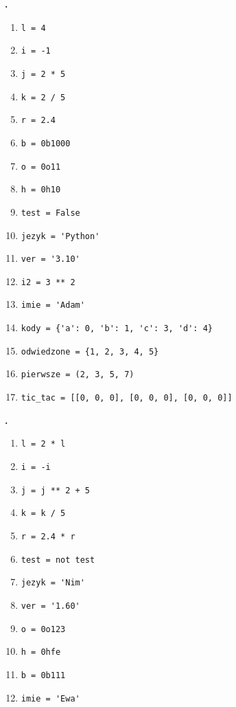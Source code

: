 \documentclass[a4paper]{article}
\begin{document}
\textbf{.}\addtocounter{zadanie}{1}

\begin{enumerate}[label=\arabic*.]
    \item \verb|l = 4|
    \item \verb|i = -1|
    \item \verb|j = 2 * 5|
    \item \verb|k = 2 / 5|
    \item \verb|r = 2.4|
    \item \verb|b = 0b1000|
    \item \verb|o = 0o11|
    \item \verb|h = 0h10|
    \item \verb|test = False|
    \item \verb|jezyk = 'Python'|
    \item \verb|ver = '3.10'|
    \item \verb|i2 = 3 ** 2|
    \item \verb|imie = 'Adam'|
    \item \verb|kody = {'a': 0, 'b': 1, 'c': 3, 'd': 4}|
    \item \verb|odwiedzone = {1, 2, 3, 4, 5}|
    \item \verb|pierwsze = (2, 3, 5, 7)|
    \item \verb|tic_tac = [[0, 0, 0], [0, 0, 0], [0, 0, 0]]|
\end{enumerate}

\textbf{.}\addtocounter{zadanie}{1}

\begin{multicols}{2}
\begin{enumerate}[label=\arabic*.]
    \item \verb|l = 2 * l|
    \item \verb|i = -i|
    \item \verb|j = j ** 2 + 5|
    \item \verb|k = k / 5|
    \item \verb|r = 2.4 * r|
    \item \verb|test = not test|
    \item \verb|jezyk = 'Nim'|
    \item \verb|ver = '1.60'|
    \item \verb|o = 0o123|
    \item \verb|h = 0hfe|
    \item \verb|b = 0b111|
    \item \verb|imie = 'Ewa'|
\end{enumerate}
\end{multicols}
\end{document}
